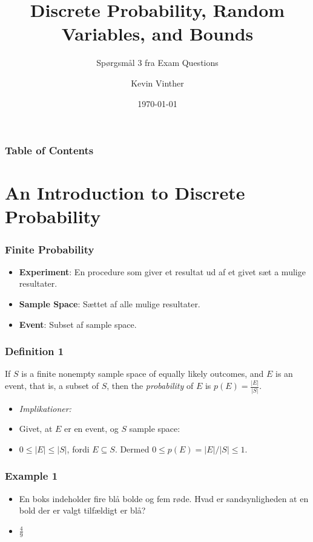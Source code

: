 \documentclass{beamer}
\title{Discrete Probability, Random Variables, and Bounds}
\subtitle{Spørgsmål 3 fra Exam Questions}
\author{Kevin Vinther}
\date{\today}
\begin{document}
\begin{frame}
    \titlepage
\end{frame}

\begin{frame}[allowframebreaks]
    \frametitle{Table of Contents}
    \tableofcontents
\end{frame}

\section{An Introduction to Discrete Probability}

\begin{frame}[allowframebreaks]
  \frametitle{Finite Probability}
  \begin{itemize}
    \item \textbf{Experiment}: En procedure som giver et resultat ud af et givet sæt a mulige resultater.
    \item \textbf{Sample Space}: Sættet af alle mulige resultater.
    \item \textbf{Event}: Subset af sample space.
  \end{itemize} 
\end{frame}

\begin{frame}
  \frametitle{Definition 1}
  \begin{definition}
If $S$ is a finite nonempty sample space of equally likely outcomes, and $E$ is an event, that is, a subset of $S$, then the \textit{probability} of $E$ is $p(E) = \frac{|E|}{|S|}$.
\end{definition}
\begin{itemize}
\item \textit{Implikationer:}
\item Givet, at $E$ er en event, og $S$ sample space:
  \item $0 \leq |E| \leq |S|$, fordi $E \subseteq S$. Dermed $0 \leq p(E) = |E|/|S| \leq 1$.
\end{itemize}
\end{frame}

\begin{frame}
  \frametitle{Example 1}
  \begin{itemize}
  \item<1-> En boks indeholder fire blå bolde og fem røde. Hvad er sandsynligheden at en bold der er valgt tilfældigt er blå?
    \item<2-> $\frac{4}{9}$
  \end{itemize}
\end{frame}
\end{document}
